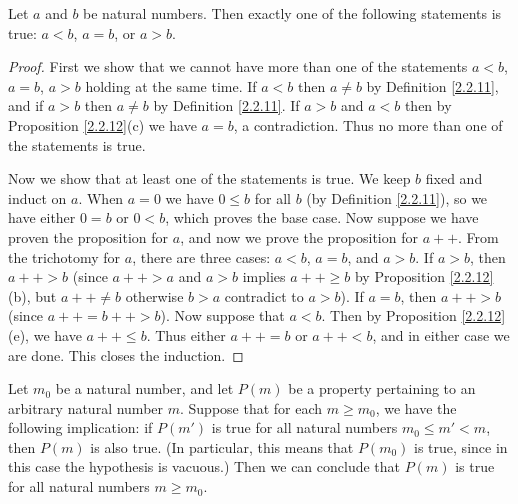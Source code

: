 \begin{proposition}\label{2.2.13}
Let \(a\) and \(b\) be natural numbers.
Then exactly one of the following statements is true: \(a < b\), \(a = b\), or \(a > b\).
\end{proposition}

\begin{proof}
First we show that we cannot have more than one of the statements \(a < b\), \(a = b\), \(a > b\) holding at the same time.
If \(a < b\) then \(a \neq b\) by Definition \ref{2.2.11}, and if \(a > b\) then \(a \neq b\) by Definition \ref{2.2.11}.
If \(a > b\) and \(a < b\) then by Proposition \ref{2.2.12}(c) we have \(a = b\), a contradiction.
Thus no more than one of the statements is true.

Now we show that at least one of the statements is true.
We keep \(b\) fixed and induct on \(a\).
When \(a = 0\) we have \(0 \leq b\) for all \(b\) (by Definition \ref{2.2.11}), so we have either \(0 = b\) or \(0 < b\), which proves the base case.
Now suppose we have proven the proposition for \(a\), and now we prove the proposition for \(a++\).
From the trichotomy for \(a\), there are three cases: \(a < b\), \(a = b\), and \(a > b\).
If \(a > b\), then \(a++ > b\) (since \(a++ > a\) and \(a > b\) implies \(a++ \geq b\) by Proposition \ref{2.2.12}(b), but \(a++ \neq b\) otherwise \(b > a\) contradict to \(a > b\)).
If \(a = b\), then \(a++ > b\) (since \(a++ = b++ > b\)).
Now suppose that \(a < b\).
Then by Proposition \ref{2.2.12}(e), we have \(a++ \leq b\).
Thus either \(a++ = b\) or \(a++ < b\), and in either case we are done.
This closes the induction.
\end{proof}

\begin{proposition}\label{2.2.14}
Let \(m_0\) be a natural number, and let \(P(m)\) be a property pertaining to an arbitrary natural number \(m\).
Suppose that for each \(m \geq m_0\), we have the following implication: if \(P(m')\) is true for all natural numbers \(m_0 \leq m' < m\), then \(P(m)\) is also true.
(In particular, this means that \(P(m_0)\) is true, since in this case the hypothesis is vacuous.)
Then we can conclude that \(P(m)\) is true for all natural numbers \(m \geq m_0\).
\end{proposition}

